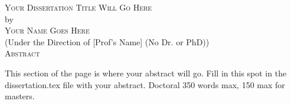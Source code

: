 \documentclass[12pt, notitlepage, twoside]{report} %
\begin{document}

\newcommand{\doctitle}{Your Dissertation Title Will Go Here}
\newcommand{\docauthor}{Your Name Goes Here}






\newpage

\thispagestyle{empty}
\vspace*{18pt}
\begin{center}
  \textsc{\Large{\doctitle}}\\[18pt]  %
  by\\[18pt]
  \textsc{\Large\docauthor}\\[12pt]
  (Under the Direction of [Prof's Name] (No Dr. or PhD))\\[12pt]
  \textsc{Abstract}
\end{center}

This section of the page is where your abstract will go. Fill in this spot in the dissertation.tex file with your abstract. Doctoral 350 words max, 150 max for masters.

\thispagestyle{empty}

\begin{list}{\textsc{Index words:\hfill}}{\leftmargin 1.4in}
  \item \begin{flushleft}
  \end{flushleft}
\end{list}
\end{document}
